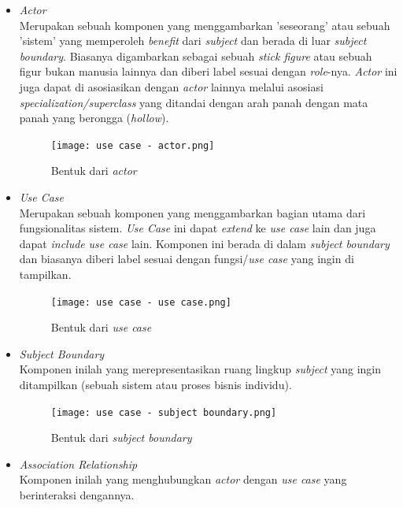 \documentclass[a4paper]{article}
\begin{document}
\begin{enumerate}
    \begin{itemize}
        \item \textit{Actor}\\
        Merupakan sebuah komponen yang menggambarkan 'seseorang' atau sebuah 'sistem' yang memperoleh \textit{benefit} dari \textit{subject} dan berada di luar \textit{subject boundary}. Biasanya digambarkan sebagai sebuah \textit{stick figure} atau sebuah figur bukan manusia lainnya dan diberi label sesuai dengan \textit{role}-nya. \textit{Actor} ini juga dapat di asosiasikan dengan \textit{actor} lainnya melalui asosiasi \textit{specialization/superclass} yang ditandai dengan arah panah dengan mata panah yang berongga (\textit{hollow})\autocite{systemanalysisdesign-use-case-diagram}.
        \begin{figure}[h]
            \centering
            \texttt{[image: use case - actor.png]}
            \caption{Bentuk dari \textit{actor}}
        \end{figure}
        \item \textit{Use Case}\\
        Merupakan sebuah komponen yang menggambarkan bagian utama dari fungsionalitas sistem. \textit{Use Case} ini dapat \textit{extend} ke \textit{use case} lain dan juga dapat \textit{include} \textit{use case} lain. Komponen ini berada di dalam \textit{subject boundary} dan biasanya diberi label sesuai dengan fungsi/\textit{use case} yang ingin di tampilkan\autocite{systemanalysisdesign-use-case-diagram}.
        \begin{figure}[h]
            \centering
            \texttt{[image: use case - use case.png]}
            \caption{Bentuk dari \textit{use case}}
        \end{figure}
        \item \textit{Subject Boundary}\\
        Komponen inilah yang merepresentasikan ruang lingkup \textit{subject} yang ingin ditampilkan (sebuah sistem atau proses bisnis individu)\autocite{systemanalysisdesign-use-case-diagram}.
        \begin{figure}[h]
            \centering
            \texttt{[image: use case - subject boundary.png]}
            \caption{Bentuk dari \textit{subject boundary}}
        \end{figure}
        \item \textit{Association Relationship}\\
        Komponen inilah yang menghubungkan \textit{actor} dengan \textit{use case} yang berinteraksi dengannya\autocite{systemanalysisdesign-use-case-diagram}.

\end{itemize}
\end{enumerate}
\end{document}
